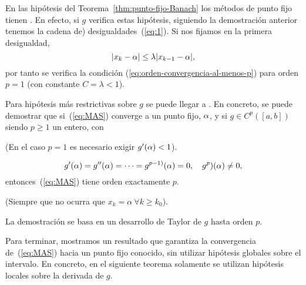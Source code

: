 \begin{remark}
  En las hipótesis del Teorema~\ref{thm:punto-fijo-Banach} los
  métodos de punto fijo tienen .  En efecto, si $g$ verifica estas hipótesis,
  siguiendo la demostración anterior tenemos la cadena de)
  desigualdades~(\ref{eq:1}). Si nos fijamos en la primera
  desigualdad,
  $$
  |x_k-\alpha|\le\lambda |x_{k-1}-\alpha|,
  $$
  por tanto se verifica la condición
  (\ref{eq:orden-convergencia-al-menos-p}) para orden $p=1$ (con
  constante $C=\lambda<1$).
\end{remark}
\begin{remark}
  Para hipótesis más restrictivas sobre $g$ se puede llegar a
  . En concreto, se puede demostrar
  que si~(\ref{eq:MAS}) converge a un punto fijo, $\alpha$, y si
  $g\in C^p([a,b])$ siendo $p \ge 1$ un entero, con
  \begin{extension}
    (En el caso $p=1$ es necesario exigir $g'(\alpha)<1$).
  \end{extension}
  \begin{equation*}
    g'(\alpha)=g''(\alpha)=\cdots=g^{p-1)}(\alpha)=0, \quad
    g^p)(\alpha)\neq 0,
  \end{equation*}
  entonces~(\ref{eq:MAS}) tiene orden exactamente $p$.
  \begin{extension}
    (Siempre que no ocurra que $x_k=\alpha\ \forall k\ge k_0$).
  \end{extension}
  La demostración se basa en un desarrollo de Taylor de $g$ hasta
  orden $p$.
  \label{rk:MAS.orden.p}
\end{remark}
Para terminar, mostramos un resultado que garantiza la convergencia
de~(\ref{eq:MAS}) hacia un punto fijo conocido, sin utilizar hipótesis
globales sobre el intervalo. En concreto, en el siguiente teorema
solamente se utilizan hipótesis locales sobre la derivada de $g$.

